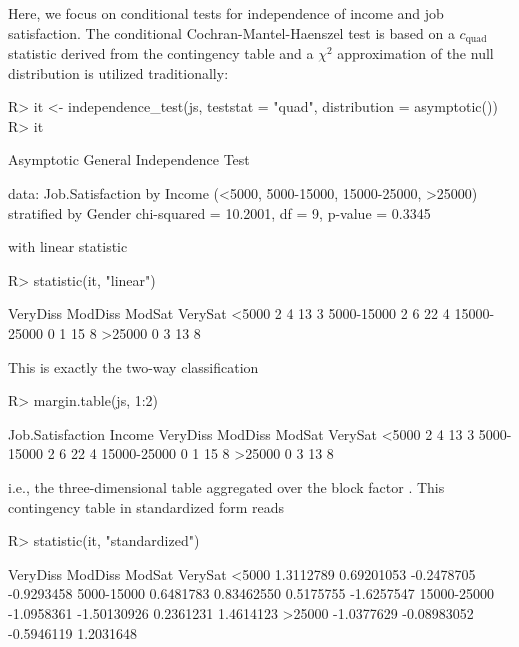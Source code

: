 \documentclass{Z}
\begin{document}
Here, we focus on conditional tests for independence 
of income and job satisfaction. The conditional Cochran-Mantel-Haenszel test is
based on a $c_\text{quad}$ statistic derived from the contingency table
and a $\chi^2$ approximation of the null distribution is utilized traditionally:
\begin{Schunk}
\begin{Sinput}
R> it <- independence_test(js, teststat = "quad", distribution = asymptotic())
R> it
\end{Sinput}
\begin{Soutput}
	Asymptotic General Independence Test

data:  Job.Satisfaction by
	 Income (<5000, 5000-15000, 15000-25000, >25000) 
	 stratified by Gender 
chi-squared = 10.2001, df = 9, p-value = 0.3345
\end{Soutput}
\end{Schunk}
with linear statistic
\begin{Schunk}
\begin{Sinput}
R> statistic(it, "linear")
\end{Sinput}
\begin{Soutput}
            VeryDiss ModDiss ModSat VerySat
<5000              2       4     13       3
5000-15000         2       6     22       4
15000-25000        0       1     15       8
>25000             0       3     13       8
\end{Soutput}
\end{Schunk}
This is exactly the two-way classification
\begin{Schunk}
\begin{Sinput}
R> margin.table(js, 1:2)
\end{Sinput}
\begin{Soutput}
             Job.Satisfaction
Income        VeryDiss ModDiss ModSat VerySat
  <5000              2       4     13       3
  5000-15000         2       6     22       4
  15000-25000        0       1     15       8
  >25000             0       3     13       8
\end{Soutput}
\end{Schunk}
i.e., the three-dimensional table aggregated over the block factor .
This contingency table in standardized form reads
\begin{Schunk}
\begin{Sinput}
R> statistic(it, "standardized")
\end{Sinput}
\begin{Soutput}
              VeryDiss     ModDiss     ModSat    VerySat
<5000        1.3112789  0.69201053 -0.2478705 -0.9293458
5000-15000   0.6481783  0.83462550  0.5175755 -1.6257547
15000-25000 -1.0958361 -1.50130926  0.2361231  1.4614123
>25000      -1.0377629 -0.08983052 -0.5946119  1.2031648
\end{Soutput}
\end{Schunk}
\end{document}
